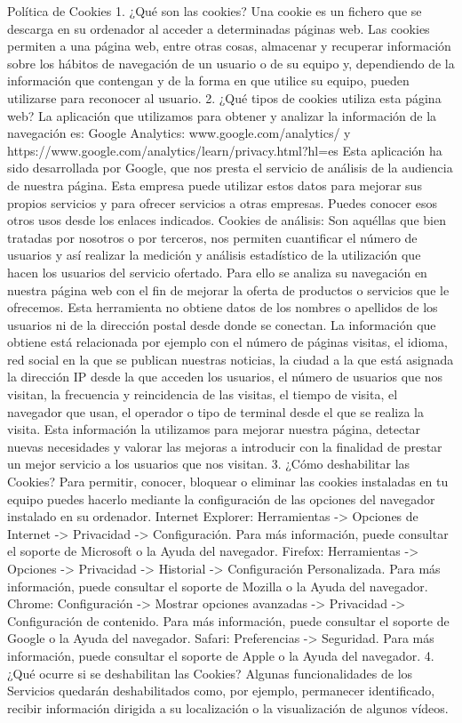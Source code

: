 \documentclass[10pt,a4paper]{article}
\begin{document}
\begin{enumerate}
Política de Cookies
1. ¿Qué son las cookies?
Una cookie es un fichero que se descarga en su ordenador al acceder a determinadas páginas web. Las cookies permiten a una página web, entre otras cosas, almacenar y recuperar información sobre los hábitos de navegación de un usuario o de su equipo y, dependiendo de la información que contengan y de la forma en que utilice su equipo, pueden utilizarse para reconocer al usuario.
2. ¿Qué tipos de cookies utiliza esta página web?
La aplicación que utilizamos para obtener y analizar la información de la navegación es: Google Analytics: www.google.com/analytics/ y https://www.google.com/analytics/learn/privacy.html?hl=es
Esta aplicación ha sido desarrollada por Google, que nos presta el servicio de análisis de la audiencia de nuestra página. Esta empresa puede utilizar estos datos para mejorar sus propios servicios y para ofrecer servicios a otras empresas. Puedes conocer esos otros usos desde los enlaces indicados.
Cookies de análisis: Son aquéllas que bien tratadas por nosotros o por terceros, nos permiten cuantificar el número de usuarios y así realizar la medición y análisis estadístico de la utilización que hacen los usuarios del servicio ofertado. Para ello se analiza su navegación en nuestra página web con el fin de mejorar la oferta de productos o servicios que le ofrecemos.
Esta herramienta no obtiene datos de los nombres o apellidos de los usuarios ni de la dirección postal desde donde se conectan. La información que obtiene está relacionada por ejemplo con el número de páginas visitas, el idioma, red social en la que se publican nuestras noticias, la ciudad a la que está asignada la dirección IP desde la que acceden los usuarios, el número de usuarios que nos visitan, la frecuencia y reincidencia de las visitas, el tiempo de visita, el navegador que usan, el operador o tipo de terminal desde el que se realiza la visita.
Esta información la utilizamos para mejorar nuestra página, detectar nuevas necesidades y valorar las mejoras a introducir con la finalidad de prestar un mejor servicio a los usuarios que nos visitan.
3. ¿Cómo deshabilitar las Cookies?
Para permitir, conocer, bloquear o eliminar las cookies instaladas en tu equipo puedes hacerlo mediante la configuración de las opciones del navegador instalado en su ordenador.
Internet Explorer: Herramientas -> Opciones de Internet -> Privacidad -> Configuración.
Para más información, puede consultar el soporte de Microsoft o la Ayuda del navegador.
Firefox: Herramientas -> Opciones -> Privacidad -> Historial -> Configuración Personalizada.
Para más información, puede consultar el soporte de Mozilla o la Ayuda del navegador.
Chrome: Configuración -> Mostrar opciones avanzadas -> Privacidad -> Configuración de contenido.
Para más información, puede consultar el soporte de Google o la Ayuda del navegador.
Safari: Preferencias -> Seguridad.
Para más información, puede consultar el soporte de Apple o la Ayuda del navegador.
4. ¿Qué ocurre si se deshabilitan las Cookies?
Algunas funcionalidades de los Servicios quedarán deshabilitados como, por ejemplo, permanecer identificado, recibir información dirigida a su localización o la visualización de algunos vídeos.

\end{enumerate}
\end{document}
